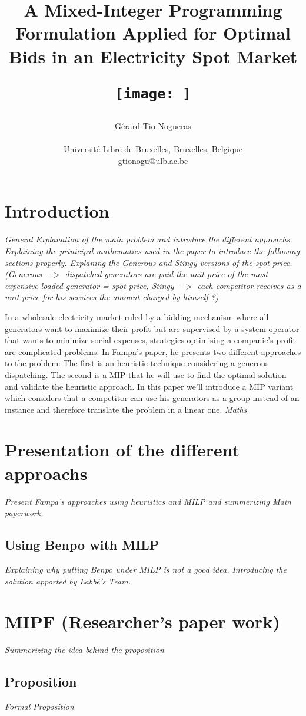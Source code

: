 \documentclass[letterpaper]{article}
\title{A Mixed-Integer Programming Formulation Applied for Optimal Bids in an Electricity Spot Market\begin{figure}
  \begin{center}
    \texttt{[image: ]}
    \caption{}
    \label{fig:}
  \end{center}
\end{figure}}
\author{Gérard Tio Nogueras \\
\mbox{}\\
Université Libre de Bruxelles, Bruxelles, Belgique \\
gtionogu@ulb.ac.be}
\begin{document}
\begin{abstract}
\end{abstract}

\section{Introduction}
\textit{General Explanation of the main problem and introduce the different approachs.
Explaining the prinicipal mathematics used in the paper to introduce the following sections properly.
Explaning the Generous and Stingy versions of the spot price.
(Generous $->$ dispatched generators are paid the unit price of the most expensive loaded generator = spot price, Stingy $->$ each competitor receives as a unit price for his services the amount charged by himself ?)}

In a wholesale electricity market ruled by a bidding mechanism where all generators want to maximize their profit but are supervised by a system operator that wants to minimize social expenses, strategies optimising a companie's profit are complicated problems.
In Fampa's paper, he presents two different approaches to the problem: The first is an heuristic technique considering a generous dispatching. The second is a MIP that he will use to find the optimal solution and validate the heuristic approach.
In this paper we'll introduce a MIP variant which considers that a competitor can use his generators as a group instead of an instance and therefore translate the problem in a linear one.
\textit{Maths}

\section{Presentation of the different approachs}
\textit{Present Fampa's approaches using heuristics and MILP and summerizing Main paperwork.}
\subsection{Using Benpo with MILP}
\textit{Explaining why putting Benpo under MILP is not a good idea.
Introducing the solution apported by Labbé's Team.}
\section{MIPF (Researcher's paper work)}
\textit{Summerizing the idea behind the proposition}
\subsection{Proposition}
\textit{Formal Proposition}
\end{document}
